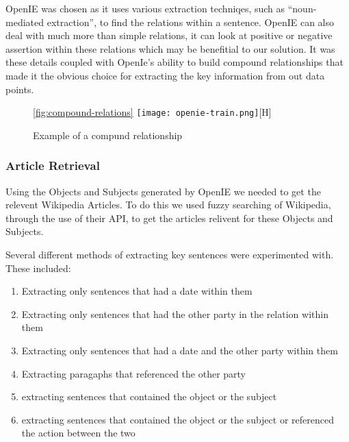 \documentclass[bsc,frontabs,twoside,singlespacing,parskip,deptreport]{infthesis}     %
\begin{document}
OpenIE was chosen as it uses various extraction techniqes, such as ``noun-mediated extraction'',
to find the relations within a sentence. OpenIE can also deal with much more than simple relations,
it can look at positive or negative assertion within these relations which may be benefitial to our
solution. It was these details coupled with OpenIe's ability to build compound relationships that
made it the obvious choice for extracting the key information from out data points.


\begin{figure}
  \centering
  \ref{fig:compound-relations}
  \texttt{[image: openie-train.png]}[H]
  \caption{Example of a compund relationship}%
  \end{figure}
\subsubsection{Article Retrieval}
Using the Objects and Subjects generated by OpenIE we needed to get the relevent Wikipedia Articles.
To do this we used fuzzy searching of Wikipedia, through the use of their API, to get the articles relivent
for these Objects and Subjects.

Several different methods of extracting key sentences were experimented with.
These included:
\begin{enumerate}
\item Extracting only sentences that had a date within them
\item Extracting only sentences that had the other party in the relation within them
\item Extracting only sentences that had a date and the other party within them
\item Extracting paragaphs that referenced the other party
  \item extracting sentences that contained the object or the subject 
  \item extracting sentences that contained the object or the subject or referenced the action between the two 
  \end{enumerate}
\end{document}
